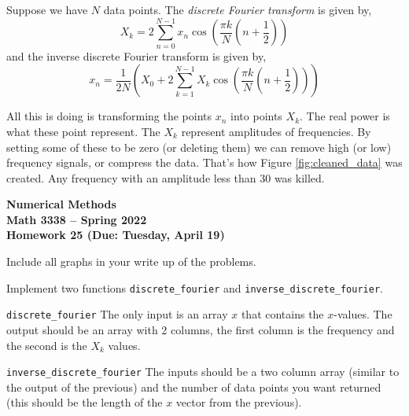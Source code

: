 \documentclass[11pt,letterpaper]{article}
\newcommand{\semester}{Spring 2022}
\newcommand{\due}{Tuesday, April 19}
\begin{document}
Suppose we have $N$ data points. The \emph{discrete Fourier transform} is given by,
\begin{equation}
\label{eqn:dct}
X_k = 2\sum_{n=0}^{N-1} x_n\cos\left(\frac{\pi k}{N}\left(n+\frac{1}{2}\right)\right)
\end{equation}
and the inverse discrete Fourier transform is given by,
\begin{equation}
\label{eqn:idct}
x_n = \frac{1}{2N}\left(X_0 + 2\sum_{k=1}^{N-1} X_k\cos\left(\frac{\pi k}{N}\left(n+\frac{1}{2}\right)\right)\right)
\end{equation}

All this is doing is transforming the points $x_n$ into points $X_k$. The real power is what these 
point represent. The $X_k$ represent amplitudes of frequencies. By setting some of these to
be zero (or deleting them) we can remove high (or low) frequency signals, or compress the data. 
That's how Figure \ref{fig:cleaned_data} was created. Any frequency with an amplitude less than
30 was killed. 






\newpage

\begin{center}
{\huge{\bf  Numerical Methods}} \\[1.5ex]
{\bf Math 3338 -- \semester}\\[1.5ex]
{\Large{\bf Homework 25 (Due: \due)}}\\
\end{center}
\vspace{2mm}

Include all graphs in your write up of the problems.



\begin{problem}
 Implement two functions \texttt{discrete\_fourier} and \texttt{inverse\_discrete\_fourier}.

\texttt{discrete\_fourier} The only input is an array $x$ that contains the $x$-values. The
output should be an array with 2 columns, the first column is the frequency and the second
is the $X_k$ values.

\texttt{inverse\_discrete\_fourier} The inputs should be a two column array (similar to the 
output of the previous) and the number of data points you want returned (this should be
the length of the $x$ vector from the previous).
\end{problem}
\end{document}
